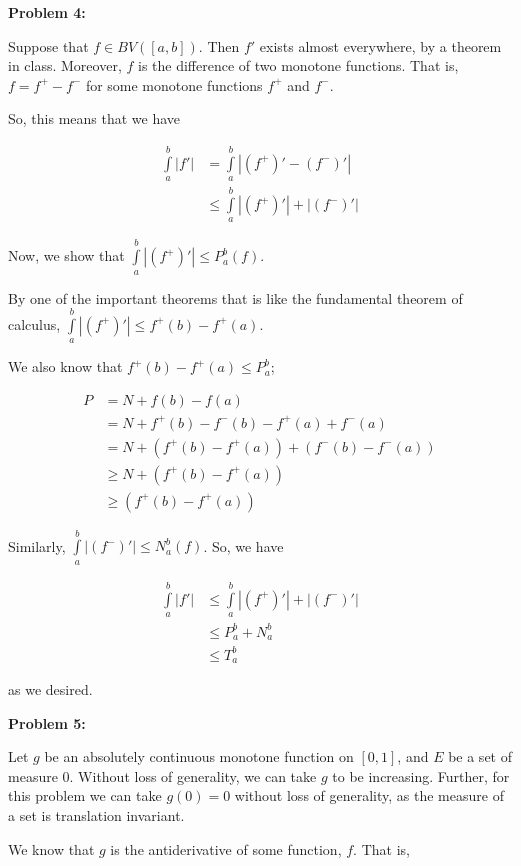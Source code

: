 \documentclass[a4paper,12pt]{article}
\newcommand{\tab}{\hspace{4mm}} %
\newcommand{\shunt}{\vspace{20mm}}
\newcommand{\absval}[1]{\left\lvert #1 \right\rvert}
\begin{document}
\shunt

{\bf Problem 4:} 

Suppose that $f \in BV([a,b])$. 
Then $f'$ exists almost everywhere, by a theorem in class. 
Moreover, $f$ is the difference of two monotone functions. 
That is, $f= f^+ -f^-$ for some monotone functions $f^+$ and $f^-$.

So, this means that we have

\begin{align*}
\int\limits_a^b \absval{f'} &= \int\limits_a^b \absval{(f^+)' - (f^-)'} \\
&\leq \int\limits_a^b \absval{(f^+)'} + \absval{(f^-)'}
\end{align*}

Now, we show that $\int\limits_a^b \absval{(f^+)'} \leq P_a^b(f)$.

\tab By one of the important theorems that is like the fundamental theorem of calculus, $\int\limits_a^b \absval{(f^+)'} \leq f^+(b)-f^+(a)$.

\tab We also know that $f^+(b) - f^+(a) \leq P_a^b$; 

\begin{align*}
P &= N +f(b)-f(a)\\
&=N+f^+(b)-f^-(b)-f^+(a)+f^-(a)\\
&=N+(f^+(b)-f^+(a))+(f^-(b)-f^-(a))\\
&\geq N+(f^+(b)-f^+(a))\\
&\geq (f^+(b)-f^+(a))
\end{align*}

Similarly, $\int\limits_a^b \absval{(f^-)'} \leq N_a^b(f)$. So, we have

\begin{align*}
\int\limits_a^b \absval{f'} &\leq \int\limits_a^b \absval{(f^+)'} + \absval{(f^-)'}\\
&\leq P_a^b + N_a^b \\
&\leq T_a^b
\end{align*}

as we desired.

\shunt

{\bf Problem 5:}

Let $g$ be an absolutely continuous monotone function on $[0,1]$, and $E$ be a set of measure $0$. Without loss of generality, we can take $g$ to be increasing. Further, for this problem we can take $g(0) = 0$ without loss of generality, as the measure of a set is translation invariant.

We know that $g$ is the antiderivative of some function, $f$. That is,
\end{document}
